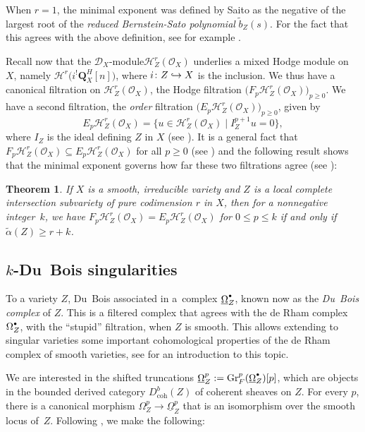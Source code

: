 \documentclass[11pt]{article}
\numberwithin{equation}{section}
\newcommand\hto{\mathrel{\lhook\joinrel\to}}
\newcommand{\sbullet}{{\scriptscriptstyle\bullet}}
\newcommand{\csbullet}{{\raisebox{1pt}{$\sbullet$}}}
\newcommand{\DXmodule}{$\cD_X$\nobreakdash-mod\-ule\xspace}
\theoremstyle{plain}
\newtheorem{thm}{Theorem}[section]
\theoremstyle{definition}
\newcommand\Q{{\mathbf Q}}
\newcommand\cD{\mathcal{D}}
\newcommand\cH{\mathcal{H}}
\newcommand\cO{\mathcal{O}}
\newcommand\cH{\mathcal{H}}
\newcommand\cO{\mathcal{O}}
\newcommand\gr{\mathrm{Gr}}
\begin{document}
When $r=1$, the minimal exponent was defined by Saito \cite{Saito_microlocal} as the negative of the largest root of the \emph{reduced Bernstein-Sato polynomial}
$\widetilde{b}_Z(s)$. For the fact that this agrees with the above definition, see for example \cite[Lem.\,5.3 and Cor.\,C]{MP5}.

Recall now that the \DXmodule $\cH^r_Z(\cO_X)$ underlies a mixed Hodge module on~$X$, namely $\cH^r\big(i^!\Q_X^H[n]\big)$, where
$i\colon Z\hto X$ is the inclusion. We thus have a canonical filtration on $\cH^r_Z(\cO_X)$, the Hodge filtration $\big(F_p\cH^r_Z(\cO_X)\big)_{p\geq 0}$.
We have a second filtration, the \emph{order} filtration $\big(E_p\cH^r_Z(\cO_X)\big)_{p\geq 0}$, given by
\[E_p\cH^r_Z(\cO_X)=\big\{u\in\cH^r_Z(\cO_X)\mid I_Z^{p+1}u=0\big\},\]
where $I_Z$ is the ideal defining $Z$ in $X$ (see \cite[Prop.\,3.11]{MP1}).
It is a general fact that $F_p\cH^r_Z(\cO_X)\subseteq E_p\cH^r_Z(\cO_X)$ for all $p\geq 0$
(see \cite[Prop.\,3.4]{MP1}) and the following result shows that the minimal exponent governs how far these two filtrations agree
(see \cite[Th.\,1.3]{CDMO}):

\begin{thm}\label{thm_local_coho}
If $X$ is a smooth, irreducible variety and $Z$ is a local complete intersection subvariety of pure codimension $r$ in $X$, then for a nonnegative integer~$k$, we have
$F_p\cH^r_Z(\cO_X)=E_p\cH^r_Z(\cO_X)$ for $0\leq p\leq k$ if and only if $\widetilde{\alpha}(Z)\geq r+k$.
\end{thm}

\subsection{$k$-Du~Bois singularities}\label{section_k_DuBois}
To a variety $Z$, Du~Bois associated in \cite{DuBois} a~complex $\underline{\Omega}_Z^{\csbullet}$, known now as the
\emph{Du~Bois complex} of $Z$. This is a filtered complex that agrees with the de Rham complex $\Omega_Z^{\csbullet}$, with the ``stupid'' filtration, when $Z$ is smooth.
This allows extending to singular varieties some important cohomological properties of the de Rham complex of smooth varieties, see \cite[Ch.\,7.3]{PetersSteenbrink}
for an introduction to this topic.

We are interested in the shifted truncations $\underline{\Omega}_Z^p:=\gr_F^p(\underline{\Omega}_Z^{\csbullet})[p]$, which are objects in the bounded derived category
$D^b_\mathrm{coh}(Z)$ of coherent sheaves on $Z$.
For every $p$, there is a canonical morphism $\Omega_Z^p\to \underline{\Omega}_Z^p$ that is an isomorphism over the smooth locus of~$Z$. Following
\cite{Saito_et_al}, we make the following:
\end{document}
